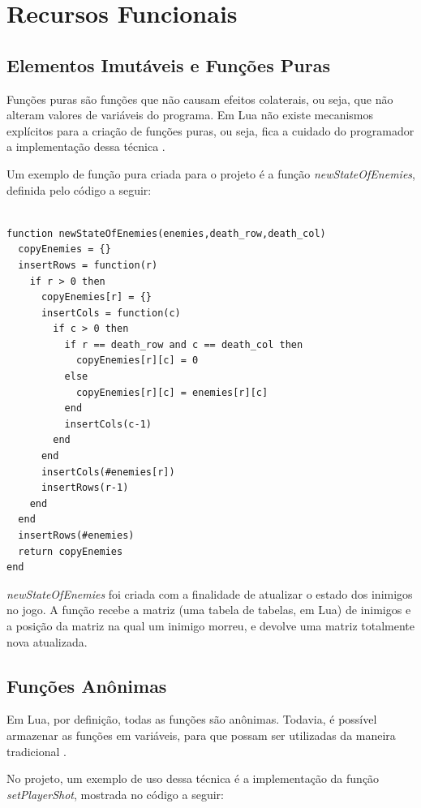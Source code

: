 \documentclass[rel_mlp]{iiufrgs}
\begin{document}

\chapter{Recursos Funcionais}

\section{Elementos Imutáveis e Funções Puras}

Funções puras são funções que não causam efeitos colaterais, ou seja, que não alteram valores de variáveis do programa. Em Lua não existe mecanismos explícitos para a criação de funções puras, ou seja, fica a cuidado do programador a implementação dessa técnica \cite{ImmutableObjectsLua}.

Um exemplo de função pura criada para o projeto é a função \textit{newStateOfEnemies}, definida pelo código a seguir:

\begin{verbatim}

function newStateOfEnemies(enemies,death_row,death_col)
  copyEnemies = {}
  insertRows = function(r)
    if r > 0 then
      copyEnemies[r] = {}
      insertCols = function(c)
        if c > 0 then
          if r == death_row and c == death_col then
            copyEnemies[r][c] = 0
          else
            copyEnemies[r][c] = enemies[r][c]
          end
          insertCols(c-1)
        end
      end
      insertCols(#enemies[r])
      insertRows(r-1)
    end
  end
  insertRows(#enemies)
  return copyEnemies
end

\end{verbatim}

\textit{newStateOfEnemies} foi criada com a finalidade de atualizar o estado dos inimigos no jogo. A função recebe a matriz (uma tabela de tabelas, em Lua) de inimigos e a posição da matriz na qual um inimigo morreu, e devolve uma matriz totalmente nova atualizada. 


\section{Funções Anônimas}

Em Lua, por definição, todas as funções são anônimas. Todavia, é possível armazenar as funções em variáveis, para que possam ser utilizadas da maneira tradicional \cite{IntroLuaPDF}.

No projeto, um exemplo de uso dessa técnica é a implementação da função \textit{setPlayerShot}, mostrada no código a seguir:
\end{document}
